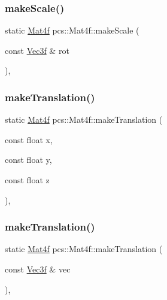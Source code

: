 \mbox{\label{structpcs_1_1Mat4f_a7d4f035fc516774ddc99f17333712a69}} 
\subsubsection{\texorpdfstring{make\+Scale()}{makeScale()}\hspace{0.1cm}{\footnotesize\ttfamily [2/2]}}
{\footnotesize\ttfamily static \hyperlink{structpcs_1_1Mat4f}{Mat4f} pcs\+::\+Mat4f\+::make\+Scale (\begin{DoxyParamCaption}\item[{const \hyperlink{namespacepcs_a68e0f517680976c17c810ffe6952cbab}{Vec3f} \&}]{rot }\end{DoxyParamCaption})\hspace{0.3cm}{\ttfamily [inline]}, {\ttfamily [static]}}

\mbox{\label{structpcs_1_1Mat4f_af221a379a3419f70b69c0339d499434c}} 
\subsubsection{\texorpdfstring{make\+Translation()}{makeTranslation()}\hspace{0.1cm}{\footnotesize\ttfamily [1/2]}}
{\footnotesize\ttfamily static \hyperlink{structpcs_1_1Mat4f}{Mat4f} pcs\+::\+Mat4f\+::make\+Translation (\begin{DoxyParamCaption}\item[{const float}]{x,  }\item[{const float}]{y,  }\item[{const float}]{z }\end{DoxyParamCaption})\hspace{0.3cm}{\ttfamily [inline]}, {\ttfamily [static]}}

\mbox{\label{structpcs_1_1Mat4f_aab015352eaa466dbb0c5c11d361f85af}} 
\subsubsection{\texorpdfstring{make\+Translation()}{makeTranslation()}\hspace{0.1cm}{\footnotesize\ttfamily [2/2]}}
{\footnotesize\ttfamily static \hyperlink{structpcs_1_1Mat4f}{Mat4f} pcs\+::\+Mat4f\+::make\+Translation (\begin{DoxyParamCaption}\item[{const \hyperlink{namespacepcs_a68e0f517680976c17c810ffe6952cbab}{Vec3f} \&}]{vec }\end{DoxyParamCaption})\hspace{0.3cm}{\ttfamily [inline]}, {\ttfamily [static]}}

